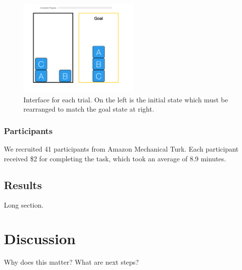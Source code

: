 \documentclass[10pt,letterpaper]{article}
\begin{document}
\begin{figure}[ht]
    \centering
    \includegraphics[width=6cm]{example-block-world}
    \caption{Interface for each trial. On the left is the initial state which must be rearranged to match the goal state at right.}
\end{figure}

\subsubsection{Participants}
We recruited 41 participants from Amazon Mechanical Turk. Each participant received \$2 for completing the task, which took an average of 8.9 minutes.

\subsection{Results}
Long section.


\section{Discussion}
Why does this matter? What are next steps?



\setlength{\bibleftmargin}{.125in}
\setlength{\bibindent}{-\bibleftmargin}


\end{document}
